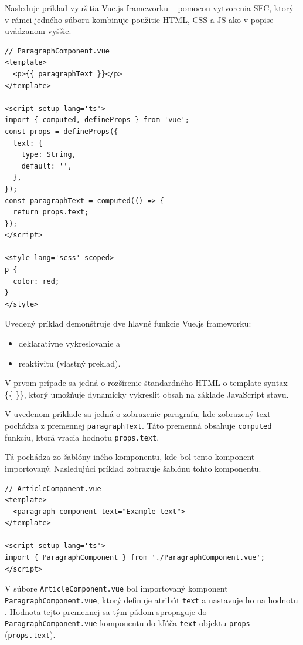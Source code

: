 Nasleduje príklad využitia Vue.js frameworku -- pomocou vytvorenia SFC, ktorý v rámci jedného súboru kombinuje použitie HTML, CSS a JS ako v popise uvádzanom vyššie.

\begin{minipage}[]{\linewidth}
\begin{verbatim}
// ParagraphComponent.vue
<template>
  <p>{{ paragraphText }}</p>
</template>

<script setup lang='ts'>
import { computed, defineProps } from 'vue';
const props = defineProps({
  text: {
    type: String,
    default: '',
  },
});
const paragraphText = computed(() => {
  return props.text;
});
</script>

<style lang='scss' scoped>
p {
  color: red;
}
</style>
\end{verbatim}
\end{minipage}

\clearpage

Uvedený príklad demonštruje dve hlavné funkcie Vue.js frameworku:
\begin {itemize}
\item {deklaratívne vykresľovanie a}
\item {reaktivitu \cite{vuejs_introduction} (vlastný preklad).}
\end {itemize}

V prvom prípade sa jedná o rozšírenie štandardného HTML o template syntax -- \{\{ \}\}, ktorý umožňuje dynamicky vykresliť obsah na základe JavaScript stavu.

V uvedenom príklade sa jedná o zobrazenie paragrafu, kde zobrazený text pochádza z premennej \texttt{paragraphText}. Táto premenná obsahuje \texttt{computed} funkciu, ktorá vracia hodnotu \texttt{props.text}.

Tá pochádza zo šablóny iného komponentu, kde bol tento komponent importovaný. Nasledujúci príklad zobrazuje šablónu tohto komponentu.

\begin{minipage}[]{\linewidth}
\begin{verbatim}
// ArticleComponent.vue
<template>
  <paragraph-component text="Example text">
</template>

<script setup lang='ts'>
import { ParagraphComponent } from './ParagraphComponent.vue';
</script>
\end{verbatim}
\end{minipage}

V súbore \texttt{ArticleComponent.vue} bol importovaný komponent \newline \texttt{ParagraphComponent.vue}, ktorý definuje atribút \texttt{text} a nastavuje ho na hodnotu . Hodnota tejto premennej sa tým pádom spropaguje do
\texttt{ParagraphComponent.vue} komponentu do kľúča \texttt{text} objektu \texttt{props} (\texttt{props.text}).

